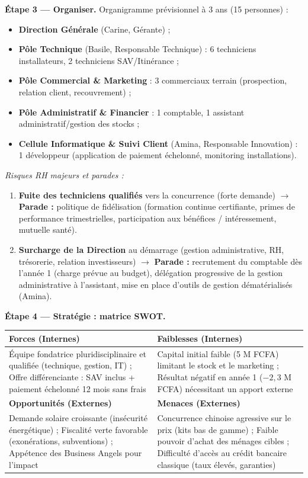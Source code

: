 \documentclass[11pt]{article}
\begin{document}
\begin{exoresolu}
\textbf{Étape 3 — Organiser.} Organigramme prévisionnel à 3 ans (15 personnes) :
\begin{itemize}
\item \textbf{Direction Générale} (Carine, Gérante) ;
\item \textbf{Pôle Technique} (Basile, Responsable Technique) : 6 techniciens installateurs, 2 techniciens SAV/Itinérance ;
\item \textbf{Pôle Commercial \& Marketing} : 3 commerciaux terrain (prospection, relation client, recouvrement) ;
\item \textbf{Pôle Administratif \& Financier} : 1 comptable, 1 assistant administratif/gestion des stocks ;
\item \textbf{Cellule Informatique \& Suivi Client} (Amina, Responsable Innovation) : 1 développeur (application de paiement échelonné, monitoring installations).
\end{itemize}

\emph{Risques RH majeurs et parades :}
\begin{enumerate}
\item \textbf{Fuite des techniciens qualifiés} vers la concurrence (forte demande) $\rightarrow$ \textbf{Parade :} politique de fidélisation (formation continue certifiante, primes de performance trimestrielles, participation aux bénéfices / intéressement, mutuelle santé).
\item \textbf{Surcharge de la Direction} au démarrage (gestion administrative, RH, trésorerie, relation investisseurs) $\rightarrow$ \textbf{Parade :} recrutement du comptable dès l'année 1 (charge prévue au budget), délégation progressive de la gestion administrative à l'assistant, mise en place d'outils de gestion dématérialisés (Amina).
\end{enumerate}

\textbf{Étape 4 — Stratégie : matrice SWOT.}

\begin{center}
\begin{tabularx}{\linewidth}{|X|X|}
\hline
\rowcolor{popgreenL} \textbf{Forces (Internes)} & \textbf{Faiblesses (Internes)} \\
\hline
Équipe fondatrice pluridisciplinaire et qualifiée (technique, gestion, IT) ; Offre différenciante : SAV inclus + paiement échelonné 12 mois sans frais & Capital initial faible (5 M FCFA) limitant le stock et le marketing ; Résultat négatif en année 1 ($-2,3$ M FCFA) nécessitant un apport externe \\
\hline
\rowcolor{poporangeL} \textbf{Opportunités (Externes)} & \textbf{Menaces (Externes)} \\
\hline
Demande solaire croissante (insécurité énergétique) ; Fiscalité verte favorable (exonérations, subventions) ; Appétence des Business Angels pour l'impact & Concurrence chinoise agressive sur le prix (kits bas de gamme) ; Faible pouvoir d'achat des ménages cibles ; Difficulté d'accès au crédit bancaire classique (taux élevés, garanties) \\
\hline
\end{tabularx}
\end{center}


\end{exoresolu}
\end{document}
